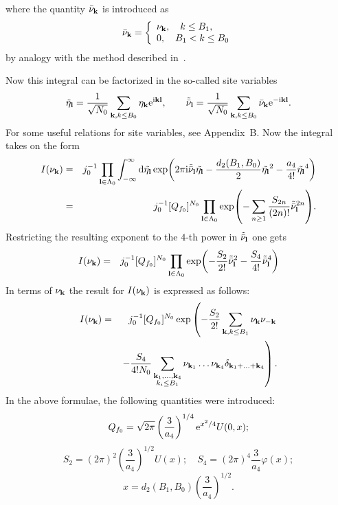 where the quantity $\bar{\nu}_{\vb k}$ is introduced as
\begin{equation*}
	\bar{\nu}_{\vb k} = \left\{
	\begin{array}{ll}
		\nu_{\vb k}, \quad k \leq B_1, \\
		0, \quad B_1 < k \leq B_0
	\end{array}
	\right.
\end{equation*}
by analogy with the method described in~\cite{MpkCMP2005}.

Now this integral can be factorized in the so-called site variables
\begin{equation*}
	\tilde{\eta}_{\vb l} = \frac{1}{\sqrt{N_0}}\sum_{\vb k, k \leq B_0}\eta_{\vb k}{\rm e}^{{\rm i}{\vb k}{\vb l}}
	, \qquad 
	\tilde{\bar{\nu}}_{\vb l}=\frac{1}{\sqrt{N_0}}\sum_{\vb k, k \leq B_0}\bar{\nu}_{\vb k}{\rm e}^{-{\rm i}{\vb k}{\vb l}}.
\end{equation*}
For some useful relations for site variables, see Appendix~B.
Now the integral takes on the form
\begin{eqnarray*}
	I(\nu_{\vb k}) & = & j_0^{-1} \prod_{\vb l \in \Lambda_0} \int_{-\infty}^{\infty} {\rm d} \tilde{\eta_{\vb l}}
	\exp(2\pi{\rm i} \tilde{\bar{\nu}}_{\vb l} \tilde{\eta_{\vb l}} -\frac{d_2(B_1, B_0)}{2} \tilde{\eta_{\vb l}}^2 - \frac{a_4}{4!}\tilde{\eta_{\vb l}}^4 )
	\\
	& = & j_0^{-1} [Q_{f_0}]^{N_0} \prod_{\vb l \in \Lambda_0} \exp(-\sum_{n \geq 1} \frac{S_{2n}}{(2n)!} \tilde{\bar{\nu}}_{\vb l}^{2n}).
\end{eqnarray*}
Restricting the resulting exponent to the $4$-th power in $\tilde{\bar{\nu}}_{\vb l}$ one gets
\begin{eqnarray*}
	I(\nu_{\vb k}) & = & j_0^{-1} [Q_{f_0}]^{N_0} \prod_{\vb l \in \Lambda_0}
	\exp(-\frac{S_2}{2!}\tilde{\bar{\nu}}_{\vb l}^2 - \frac{S_4}{4!}\tilde{\bar{\nu}}_{\vb l}^4 )
\end{eqnarray*}
In terms of $\nu_{\vb k}$ the result for $I(\nu_{\vb k})$ is expressed as follows:
\begin{eqnarray*}
	I(\nu_{\vb k}) & = & j_0^{-1} [Q_{f_0}]^{N_0} 
	\exp \left(- \frac{S_2}{2!} \sum_{\vb k, k \leq B_1} \nu_{\vb k} \nu_{-\vb k}
	\right.
	\\
	& & \left.
	 - \frac{S_4}{4! N_0} \sum_{\substack{\vb k_1, \dotsc, \vb k_4 \\ k_i \leq B_1}} \nu_{\vb k_1} \dotsc \nu_{\vb k_4} \delta_{\vb{k}_1 + \dotsc + \vb{k}_4}
	 \right)
	 .
\end{eqnarray*}
In the above formulae, the following quantities were introduced:
\begin{equation*}
	Q_{f_0} = \sqrt{2\pi}\left(\frac{3}{a_4}\right)^{1/4} {\rm e}^{x^2/4} U(0,x);
\end{equation*}
\begin{equation*}
	S_2 = (2\pi)^2 \left(\frac{3}{a_4}\right)^{1/2} U(x); \quad S_4 = (2\pi)^4 \frac{3}{a_4}\varphi(x);
\end{equation*}
\begin{equation*}
	x = d_2(B_1, B_0) \left(\frac{3}{a_4}\right)^{1/2}.
\end{equation*}

